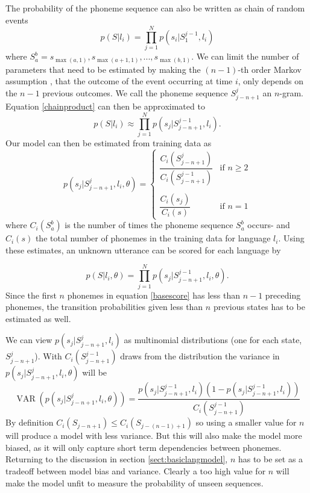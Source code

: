 The probability of the phoneme sequence can also be written as chain of random events
\begin{equation}
\label{chainproduct}
p(S|l_i) = \prod_{j=1}^Np(s_i|S_1^{j-1}, l_i)
\end{equation}
where $S_a^b = s_{\max(a,1)}, s_{\max(a+1,1)}, ... , s_{\max(b, 1)}$. We can limit the number of parameters that need to be estimated by making the $(n-1)$-th order Markov assumption \cite[p. 376]{talegk}, that the outcome of the event occurring at time $i$, only depends on the $n-1$ previous outcomes. We call the phoneme sequence $S_{j-n+1}^j$ an $n$-gram. Equation \ref{chainproduct} can then be approximated to
\begin{equation}
\label{markovchain}
p(S|l_i) \approx \prod_{j=1}^Np(s_j|S_{j-n+1}^{j-1},l_i).
\end{equation}
Our model can then be estimated from training data as
\begin{equation}
\label{baselinetrain}
p(s_j|S_{j-n+1}^j, l_i, \theta) = 
\begin{cases} 
\dfrac{C_i(S_{j-n+1}^j)}{C_i(S_{j-n+1}^{j-1})} & \text{if $n \geq 2$} \\ \\
\dfrac{C_i(s_j)}{C_i(s)} & \text{if $n = 1$}
\end{cases}
\end{equation}
where $C_i(S_a^b)$ is the number of times the phoneme sequence $S_a^b$ occurs- and $C_i(s)$ the total number of phonemes in the training data for language $l_i$. Using these estimates, an unknown utterance can be scored for each language by

\begin{equation}
\label{basescore}
p(S|l_i, \theta) = \prod_{j=1}^Np(s_j|S_{j-n+1}^{j-1}, l_i, \theta).
\end{equation}
Since the first $n$ phonemes in equation \ref{basescore} has less than $n-1$ preceding phonemes, the transition probabilities given less than $n$ previous states has to be estimated as well.

We can view $p(s_j|S_{j-n+1}^j, l_i)$ as multinomial distributions (one for each state, $S_{j-n+1}^j$). With $C_i(S_{j-n+1}^{j-1})$ draws from the distribution the variance in $p(s_j|S_{j-n+1}^j, l_i, \theta)$ will be
\begin{equation}
\label{baselinevar}
\operatorname{VAR}(p(s_j|S_{j-n+1}^j, l_i, \theta)) = \frac{p(s_j|S_{j-n+1}^{j-1}, l_i)(1-p(s_j|S_{j-n+1}^{j-1}, l_i))}{C_i(S_{j-n+1}^{j-1})}
\end{equation}
 By definition $C_i(S_{j-n+1}) \leq C_i(S_{j-(n-1)+1})$ so using a smaller value for $n$ will produce a model with less variance. But this will also make the model more biased, as it will only capture short term dependencies between phonemes. Returning to the discussion in section \ref{sect:basiclangmodel}, $n$ has to be set as a tradeoff between model bias and variance. Clearly a too high value for $n$ will make the model unfit to measure the probability of unseen sequences.


